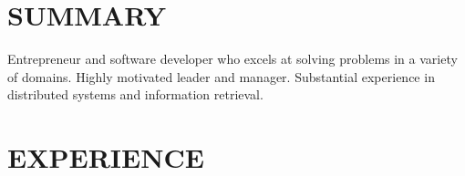 \documentclass[overlapped, 10pt]{res} %
\begin{document}
\begin{resume}

 
\section{SUMMARY}  

Entrepreneur and software developer who excels at solving problems in a variety of domains. Highly motivated leader and manager.
Substantial experience in distributed systems and information retrieval.

 
\section{EXPERIENCE}


\end{resume}
\end{document}
